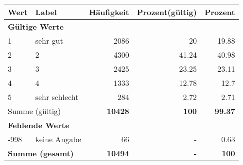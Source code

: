      \begin{longtable}{lXrrr}
     \toprule
     \textbf{Wert} & \textbf{Label} & \textbf{Häufigkeit} & \textbf{Prozent(gültig)} & \textbf{Prozent} \\
     \endhead
     \midrule
     \multicolumn{5}{l}{\textbf{Gültige Werte}}\\

     1 &
     \multicolumn{1}{X}{ sehr gut   } &


       \num{2086} &
       \num[round-mode=places,round-precision=2]{20} &
         \num[round-mode=places,round-precision=2]{19,88} \\

     2 &
     \multicolumn{1}{X}{ 2   } &


       \num{4300} &
       \num[round-mode=places,round-precision=2]{41,24} &
         \num[round-mode=places,round-precision=2]{40,98} \\

     3 &
     \multicolumn{1}{X}{ 3   } &


       \num{2425} &
       \num[round-mode=places,round-precision=2]{23,25} &
         \num[round-mode=places,round-precision=2]{23,11} \\

     4 &
     \multicolumn{1}{X}{ 4   } &


       \num{1333} &
       \num[round-mode=places,round-precision=2]{12,78} &
         \num[round-mode=places,round-precision=2]{12,7} \\

     5 &
     \multicolumn{1}{X}{ sehr schlecht   } &


       \num{284} &
       \num[round-mode=places,round-precision=2]{2,72} &
         \num[round-mode=places,round-precision=2]{2,71} \\
     \midrule
     \multicolumn{2}{l}{Summe (gültig)} &
       \textbf{\num{10428}} &
     \textbf{100} &
       \textbf{\num[round-mode=places,round-precision=2]{99,37}} \\
     \multicolumn{5}{l}{\textbf{Fehlende Werte}}\\
       -998 &
       keine Angabe &
         \num{66} &
        - &
         \num[round-mode=places,round-precision=2]{0,63} \\
     \midrule
     \multicolumn{2}{l}{\textbf{Summe (gesamt)}} &
          \textbf{\num{10494}} &
        \textbf{-} &
        \textbf{100} \\
     \bottomrule
     \end{longtable}
     
